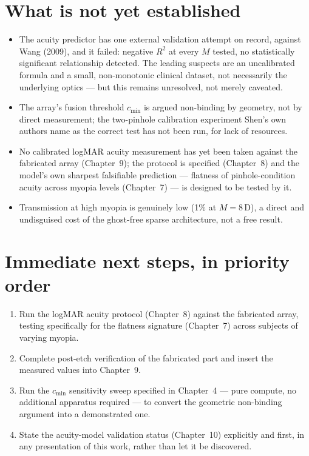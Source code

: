 \documentclass[11pt]{report}
\begin{document}
\section{What is not yet established}

\begin{itemize}[leftmargin=1.2cm]
\item The acuity predictor has one external validation attempt on record, against Wang
(2009), and it failed: negative $R^2$ at every $M$ tested, no statistically significant
relationship detected. The leading suspects are an uncalibrated formula and a small,
non-monotonic clinical dataset, not necessarily the underlying optics --- but this remains
unresolved, not merely caveated.
\item The array's fusion threshold $c_{\min}$ is argued non-binding by geometry, not by
direct measurement; the two-pinhole calibration experiment Shen's own authors name as the
correct test has not been run, for lack of resources.
\item No calibrated logMAR acuity measurement has yet been taken against the fabricated
array (Chapter~9); the protocol is specified (Chapter~8) and the model's own sharpest
falsifiable prediction --- flatness of pinhole-condition acuity across myopia levels
(Chapter~7) --- is designed to be tested by it.
\item Transmission at high myopia is genuinely low (1\% at $M=8$\,D), a direct and
undisguised cost of the ghost-free sparse architecture, not a free result.
\end{itemize}

\section{Immediate next steps, in priority order}

\begin{enumerate}[leftmargin=1.2cm]
\item Run the logMAR acuity protocol (Chapter~8) against the fabricated array, testing
specifically for the flatness signature (Chapter~7) across subjects of varying myopia.
\item Complete post-etch verification of the fabricated part and insert the measured
values into Chapter~9.
\item Run the $c_{\min}$ sensitivity sweep specified in Chapter~4 --- pure compute, no
additional apparatus required --- to convert the geometric non-binding argument into a
demonstrated one.
\item State the acuity-model validation status (Chapter~10) explicitly and first, in any
presentation of this work, rather than let it be discovered.
\end{enumerate}
\end{document}
